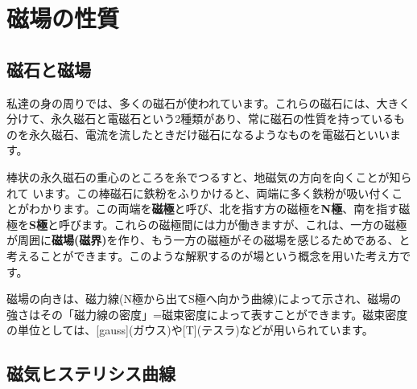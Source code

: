 %
%


\section{磁場の性質}

\subsection{磁石と磁場}

私達の身の周りでは、多くの磁石が使われています。これらの磁石には、大きく分けて、永久磁石と電磁石という2種類があり、常に磁石の性質を持っているものを永久磁石、電流を流したときだけ磁石になるようなものを電磁石といいます。

棒状の永久磁石の重心のところを糸でつるすと、地磁気の方向を向くことが知られて
います。この棒磁石に鉄粉をふりかけると、両端に多く鉄粉が吸い付くことがわかります。この両端を{\bf 磁極}と呼び、北を指す方の磁極を{\bf N極}、南を指す磁極を{\bf S極}と呼びます。これらの磁極間には力が働きますが、これは、一方の磁極が周囲に{\bf 磁場(磁界)}を作り、もう一方の磁極がその磁場を感じるためである、と考えることができます。このような解釈するのが場という概念を用いた考え方です。

磁場の向きは、磁力線(N極から出てS極へ向かう曲線)によって示され、磁場の強さはその「磁力線の密度」=磁束密度によって表すことができます。磁束密度の単位としては、[gauss](ガウス)や[T](テスラ)などが用いられています。

%

\subsection{磁気ヒステリシス曲線}

